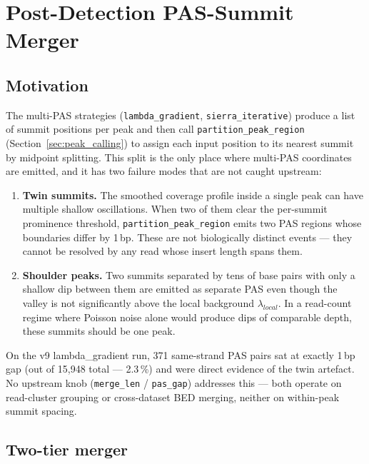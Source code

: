 \documentclass[11pt,a4paper]{article}
\begin{document}
\section{Post-Detection PAS-Summit Merger}
\label{sec:pas-merge}

\subsection{Motivation}

The multi-PAS strategies (\texttt{lambda\_gradient}, \texttt{sierra\_iterative})
produce a list of summit positions per peak and then call
\texttt{partition\_peak\_region} (Section~\ref{sec:peak_calling}) to assign each
input position to its nearest summit by midpoint splitting.  This split is the
only place where multi-PAS coordinates are emitted, and it has two failure
modes that are not caught upstream:

\begin{enumerate}
  \item \textbf{Twin summits.}  The smoothed coverage profile inside a single
        peak can have multiple shallow oscillations.  When two of them clear
        the per-summit prominence threshold, \texttt{partition\_peak\_region}
        emits two PAS regions whose boundaries differ by 1\,bp.  These are not
        biologically distinct events --- they cannot be resolved by any read
        whose insert length spans them.

  \item \textbf{Shoulder peaks.}  Two summits separated by tens of base pairs
        with only a shallow dip between them are emitted as separate PAS even
        though the valley is not significantly above the local background
        $\lambda_{local}$.  In a read-count regime where Poisson noise alone
        would produce dips of comparable depth, these summits should be one
        peak.
\end{enumerate}

On the v9 lambda\_gradient run, 371 same-strand PAS pairs sat at exactly 1\,bp
gap (out of 15{,}948 total --- 2.3\,\%) and were direct evidence of the twin
artefact.  No upstream knob (\texttt{merge\_len} / \texttt{pas\_gap}) addresses
this --- both operate on read-cluster grouping or cross-dataset BED merging,
neither on within-peak summit spacing.

\subsection{Two-tier merger}
\end{document}
